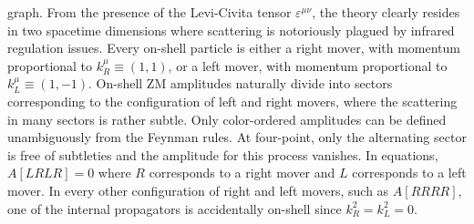 \documentclass[11pt,letter]{article}
\begin{document}
graph.  From the presence of the Levi-Civita tensor
$\varepsilon^{\mu\nu}$, the theory clearly resides in two spacetime
dimensions where scattering is notoriously plagued by infrared
regulation issues.  Every on-shell particle is either a right mover,
with momentum proportional to $k_R^\mu \equiv (1,1)$, or a left mover,
with momentum proportional to $k_L^\mu \equiv (1,-1)$.  On-shell ZM
amplitudes naturally divide into sectors corresponding to the
configuration of left and right movers, where the scattering in many
sectors is rather subtle.  Only color-ordered amplitudes can be
defined unambiguously from the Feynman rules.  At four-point, only the
alternating sector is free of subtleties and the amplitude for this
process vanishes.  In equations, $A[LRLR]=0$ where $R$ corresponds to
a right mover and $L$ corresponds to a left mover.  In every other
configuration of right and left movers, such as $A[RRRR]$, one of the
internal propagators is accidentally on-shell since $k_R^2=k_L^2=0$.
\end{document}
